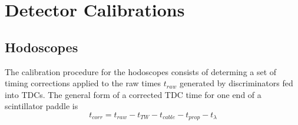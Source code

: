 \section{Detector Calibrations}
\subsection{Hodoscopes}
The calibration procedure for the hodoscopes consists of determing a set of
timing corrections applied to the raw times $t_{raw}$ generated by
discriminators fed into TDCs.
The general form of a corrected TDC time for one end of a scintillator paddle
is
\begin{equation}
    t_{corr} = t_{raw} - t_{TW} - t_{cable} - t_{prop} - t_{\lambda}
\end{equation}

